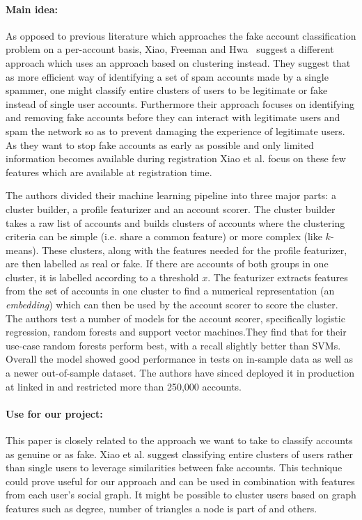 \paragraph{Main idea:}
As opposed to previous literature which approaches the fake account classification problem on a per-account basis, Xiao, Freeman and Hwa~\cite{xiao2015detecting} suggest a different approach which uses an approach based on clustering instead. They suggest that as more efficient way of identifying a set of spam accounts made by a single spammer, one might classify entire clusters of users to be legitimate or fake instead of single user accounts. Furthermore their approach focuses on identifying and removing fake accounts before they can interact with legitimate users and spam the network so as to prevent damaging the experience of legitimate users. As they want to stop fake accounts as early as possible and only limited information becomes available during registration Xiao et al. focus on these few features which are available at registration time.

The authors divided their machine learning pipeline into three major parts: a cluster builder, a profile featurizer and an account scorer. The cluster builder takes a raw list of accounts and builds clusters of accounts where the clustering criteria can be simple (i.e. share a common feature) or more complex (like $k$-means). These clusters, along with the features needed for the profile featurizer, are then labelled as real or fake. If there are accounts of both groups in one cluster, it is labelled according to a threshold $x$. The featurizer extracts features from the set of accounts in one cluster to find a numerical representation (an \textit{embedding}) which can then be used by the account scorer to score the cluster. The authors test a number of models for the account scorer, specifically logistic regression, random forests and support vector machines.They find that for their use-case random forests perform best, with a recall slightly better than SVMs. Overall the model showed good performance in tests on in-sample data as well as a newer out-of-sample dataset. The authors have sinced deployed it in production at linked in and restricted more than 250,000 accounts.

\paragraph{Use for our project:}
This paper is closely related to the approach we want to take to classify accounts as genuine or as fake. Xiao et al. suggest classifying entire clusters of users rather than single users to leverage similarities between fake accounts. This technique could prove useful for our approach and can be used in combination with features from each user's social graph. It might be possible to cluster users based on graph features such as degree, number of triangles a node is part of and others.

